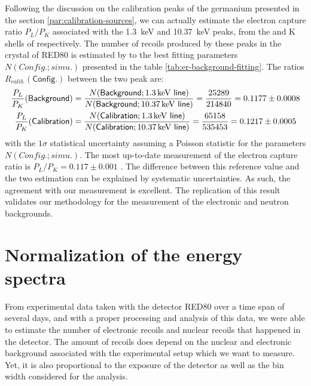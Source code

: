 
Following the discussion on the calibration peaks of the germanium presented in the section \ref{par:calibration-sources}, we can actually estimate the electron capture ratio $P_L/P_K$ associated with the \SI{1.3}{\kilo\eV} and \SI{10.37}{\kilo\eV} peaks, from the  and K shells of  respectively.
The number of recoils produced by these peaks in the crystal of RED80 is estimated by to the best fitting parameters $N(Config.; simu.)$ presented in the table \ref{tab:er-background-fitting}. The ratios $R_{calib.}(\textsf{Config.})$ between the two peak are:
\begin{align}
\frac{P_L}{P_K}(\textsf{Background}) 
&=
\frac{
N(\textsf{Background}; \textsf{\SI{1.3}{\kilo\eV} line})
}{
N(\textsf{Background}; \textsf{\SI{10.37}{\kilo\eV} line})
}
=
\frac{25289}{214840}
=
0.1177 \pm 0.0008
\\
\frac{P_L}{P_K} (\textsf{Calibration}) 
&=
\frac{
N(\textsf{Calibration}; \textsf{\SI{1.3}{\kilo\eV} line})
}{
N(\textsf{Calibration}; \textsf{\SI{10.37}{\kilo\eV} line})
}
=
\frac{65158}{535453}
=
0.1217 \pm 0.0005
\end{align}
with the $1\sigma$ statistical uncertainty assuming a Poisson statistic for the parameters $N(Config.; simu.)$. The most up-to-date measurement of the electron capture ratio is $P_L/P_K=0.117 \pm 0.001$ \cite{Bambynek:1977}. The difference between this reference value and the two estimation can be explained by systematic uncertainties. As such, the agreement with our measurement is excellent. The replication of this result validates our methodology for the measurement of the electronic and neutron backgrounds.


\section{Normalization of the energy spectra}
\label{par:exposure}
\label{par:normalization}

From experimental data taken with the detector RED80 over a time span of several days, and with a proper processing and analysis of this data, we were able to estimate the number of electronic recoils and nuclear recoils that happened in the detector.
The amount of recoils does depend on the nuclear and electronic background associated with the experimental setup which we want to measure. Yet, it is also proportional to the exposure of the detector as well as the bin width considered for the analysis.

